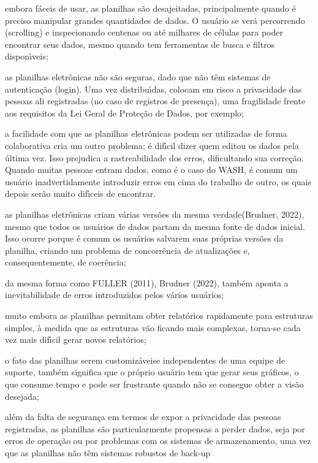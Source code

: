 \documentclass[
12pt,		%
openright,	%
twoside,  %
a4paper,			%
chapter=TITLE,		%
english,			%
french,				%
spanish,			%
brazil				%
]{USPSC-classe/USPSC}
\begin{document}
\begin{alineas}
\item embora f\'aceis de usar, as planilhas s\~ao desajeitadas, principalmente quando \'e preciso manipular grandes quantidades de dados. O usu\'ario se ver\'a percorrendo (scrolling) e inspecionando centenas ou at\'e milhares de c\'elulas para poder encontrar seus dados, mesmo quando tem ferramentas de busca e filtros dispon\'{\i}veis;
\item as planilhas eletr\^onicas n\~ao s\~ao seguras, dado que n\~ao t\^em sistemas de autentica\c{c}\~ao (login). Uma vez distribu\'{\i}das, colocam em risco a privacidade das pessoas ali registradas (no caso de registros de presen\c{c}a), uma fragilidade frente aos requisitos da Lei Geral de Prote\c{c}\~ao de Dados, por exemplo;
\item a facilidade com que as planilhas eletr\^onicas podem ser utilizadas de forma colaborativa cria um outro problema; \'e dif\'{\i}cil dizer quem editou os dados pela \'ultima vez. Isso prejudica a rastreabilidade dos erros, dificultando sua corre\c{c}\~ao. Quando muitas pessoas entram dados, como \'e o caso do WASH, \'e comum um usu\'ario inadvertidamente introduzir erros em cima do trabalho de outro, os quais depois ser\~ao muito dif\'{\i}ceis de encontrar.
\item as planilhas eletr\^onicas criam v\'arias vers\~oes da mesma \textquotedbl verdade\textquotedbl   (Brudner, 2022), mesmo que todos os usu\'arios de dados partam da mesma fonte de dados inicial. Isso ocorre porque \'e comum os usu\'arios salvarem suas pr\'oprias vers\~oes da planilha, criando um problema de concorr\^encia de atualiza\c{c}\~oes e, consequentemente, de coer\^encia;
\item da mesma forma como  FULLER (2011),  Brudner (2022), tamb\'em aponta a inevitabilidade de erros introduzidos pelos v\'arios usu\'arios;
\item muito embora as planilhas permitam obter relat\'orios rapidamente para estruturas simples, \`a medida que as estruturas v\~ao ficando mais complexas, torna-se cada vez mais dif\'{\i}cil gerar novos relat\'orios;
\item o fato das planilhas serem \textquotedbl customiz\'aveis\textquotedbl  e independentes de uma equipe de suporte, tamb\'em significa que o pr\'oprio usu\'ario tem que gerar seus gr\'aficos, o que consume tempo e pode ser frustrante quando n\~ao se consegue obter a vis\~ao desejada;
\item al\'em da falta de seguran\c{c}a em termos de expor a privacidade das pessoas registradas, as planilhas s\~ao particularmente propensas a perder dados, seja por erros de opera\c{c}\~ao ou por problemas com os sistemas de armazenamento, uma vez que as planilhas n\~ao t\^em sistemas robustos de \textquotedbl back-up\textquotedbl 

\end{alineas}
\end{document}
